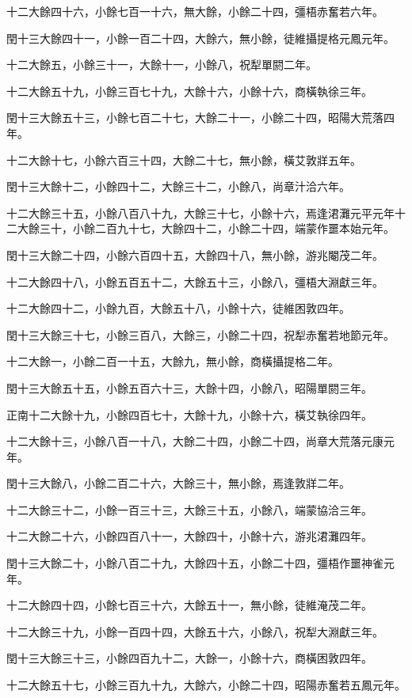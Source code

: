 十二大餘四十六，小餘七百一十六，無大餘，小餘二十四，彊梧赤奮若六年。

閏十三大餘四十一，小餘一百二十四，大餘六，無小餘，徒維攝提格元鳳元年。

十二大餘五，小餘三十一，大餘十一，小餘八，祝犁單閼二年。

十二大餘五十九，小餘三百七十九，大餘十六，小餘十六，商橫執徐三年。

閏十三大餘五十三，小餘七百二十七，大餘二十一，小餘二十四，昭陽大荒落四年。

十二大餘十七，小餘六百三十四，大餘二十七，無小餘，橫艾敦牂五年。

閏十三大餘十二，小餘四十二，大餘三十二，小餘八，尚章汁洽六年。

十二大餘三十五，小餘八百八十九，大餘三十七，小餘十六，焉逢涒灘元平元年十二大餘三十，小餘二百九十七，大餘四十二，小餘二十四，端蒙作噩本始元年。

閏十三大餘二十四，小餘六百四十五，大餘四十八，無小餘，游兆閹茂二年。

十二大餘四十八，小餘五百五十二，大餘五十三，小餘八，彊梧大淵獻三年。

十二大餘四十二，小餘九百，大餘五十八，小餘十六，徒維困敦四年。

閏十三大餘三十七，小餘三百八，大餘三，小餘二十四，祝犁赤奮若地節元年。

十二大餘一，小餘二百一十五，大餘九，無小餘，商橫攝提格二年。

閏十三大餘五十五，小餘五百六十三，大餘十四，小餘八，昭陽單閼三年。

正南十二大餘十九，小餘四百七十，大餘十九，小餘十六，橫艾執徐四年。

十二大餘十三，小餘八百一十八，大餘二十四，小餘二十四，尚章大荒落元康元年。

閏十三大餘八，小餘二百二十六，大餘三十，無小餘，焉逢敦牂二年。

十二大餘三十二，小餘一百三十三，大餘三十五，小餘八，端蒙協洽三年。

十二大餘二十六，小餘四百八十一，大餘四十，小餘十六，游兆涒灘四年。

閏十三大餘二十，小餘八百二十九，大餘四十五，小餘二十四，彊梧作噩神雀元年。

十二大餘四十四，小餘七百三十六，大餘五十一，無小餘，徒維淹茂二年。

十二大餘三十九，小餘一百四十四，大餘五十六，小餘八，祝犁大淵獻三年。

閏十三大餘三十三，小餘四百九十二，大餘一，小餘十六，商橫困敦四年。

十二大餘五十七，小餘三百九十九，大餘六，小餘二十四，昭陽赤奮若五鳳元年。

